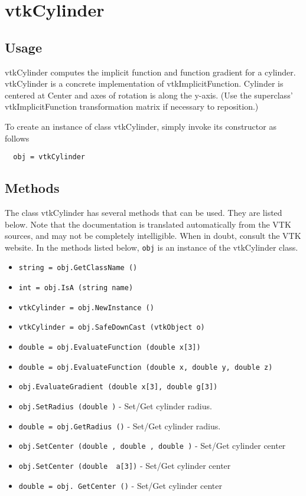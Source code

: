 \section{vtkCylinder}

\subsection{Usage}

 vtkCylinder computes the implicit function and function gradient for a
 cylinder. vtkCylinder is a concrete implementation of vtkImplicitFunction.
 Cylinder is centered at Center and axes of rotation is along the
 y-axis. (Use the superclass' vtkImplicitFunction transformation matrix if
 necessary to reposition.)

To create an instance of class vtkCylinder, simply
invoke its constructor as follows
\begin{verbatim}
  obj = vtkCylinder
\end{verbatim}
\subsection{Methods}

The class vtkCylinder has several methods that can be used.
  They are listed below.
Note that the documentation is translated automatically from the VTK sources,
and may not be completely intelligible.  When in doubt, consult the VTK website.
In the methods listed below, \verb|obj| is an instance of the vtkCylinder class.
\begin{itemize}
\item  \verb|string = obj.GetClassName ()|

\item  \verb|int = obj.IsA (string name)|

\item  \verb|vtkCylinder = obj.NewInstance ()|

\item  \verb|vtkCylinder = obj.SafeDownCast (vtkObject o)|

\item  \verb|double = obj.EvaluateFunction (double x[3])|

\item  \verb|double = obj.EvaluateFunction (double x, double y, double z)|

\item  \verb|obj.EvaluateGradient (double x[3], double g[3])|

\item  \verb|obj.SetRadius (double )| -  Set/Get cylinder radius.

\item  \verb|double = obj.GetRadius ()| -  Set/Get cylinder radius.

\item  \verb|obj.SetCenter (double , double , double )| -  Set/Get cylinder center

\item  \verb|obj.SetCenter (double  a[3])| -  Set/Get cylinder center

\item  \verb|double = obj. GetCenter ()| -  Set/Get cylinder center

\end{itemize}
